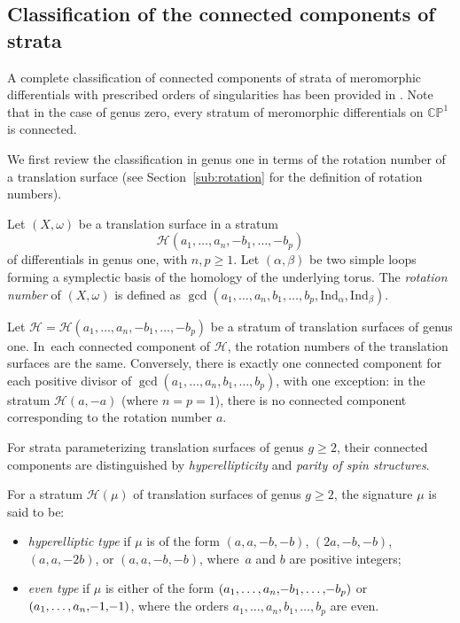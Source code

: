 \subsection{Classification of the connected components of strata}\label{sub:CCClassification}

A complete classification of connected components of strata of meromorphic differentials with prescribed orders of singularities has been provided in \cite{Bo}. Note that in the case of genus zero, every stratum of meromorphic differentials on $\mathbb C\mathbb P^1$ is connected.

We first review the classification in genus one in terms of the rotation number of a translation surface (see Section~\ref{sub:rotation} for the definition of rotation numbers).

\begin{defn}
Let $(X,\omega)$ be a translation surface in a stratum
\[
\mathcal{H}(a_{1},\dots,a_{n},-b_{1},\dots,-b_{p})
\]
of differentials in genus one, with $n,p \geq 1$. Let $(\alpha,\beta)$ be two simple loops forming a symplectic basis of the homology of the underlying torus. The \textit{rotation number} of $(X,\omega)$ is defined as $\gcd(a_{1},\dots,a_{n},b_{1},\dots,b_{p},\mathrm{Ind}_{\alpha},\mathrm{Ind}_{\beta})$.
\end{defn}

\begin{thm}\label{thm:BoissyGenusOne}
Let $\mathcal{H}=\mathcal{H}(a_{1},\dots,a_{n},-b_{1},\dots,-b_{p})$ be a stratum of translation surfaces of genus one. In~each connected component of $\mathcal{H}$, the rotation numbers of the translation surfaces are the same. Conversely, there is exactly one connected component for each positive divisor of $\gcd(a_{1},\dots,a_{n},b_{1},\dots,b_{p})$, with one exception: in the stratum $\mathcal{H}(a,-a)$ (where $n=p=1$), there is no connected component corresponding to the rotation number $a$.
\end{thm}

For strata parameterizing translation surfaces of genus $g \geq 2$, their connected components are distinguished by \textit{hyperellipticity} and \textit{parity of spin structures}.

\begin{defn}
For a stratum $\mathcal{H}(\mu)$ of translation surfaces of genus $g \geq 2$, the signature $\mu$ is said to be:
\begin{itemize}
\item \textit{hyperelliptic type} if $\mu$ is of the form $(a,a,-b,-b)$, $(2a,-b,-b)$, $(a,a,-2b)$, or $(a,a,-b,-b)$, where~$a$ and $b$ are positive integers;
\item \textit{even type} if $\mu$ is either of the form $(a_{1},\dots,a_{n},\mkern-3mu -b_{1},\dots,\mkern-3mu -b_{p})$ or $(a_{1},\dots,a_{n},\mkern-3mu-1,\mkern-3mu -1)$, where the orders $a_{1},\dots,a_{n},b_{1},\dots,b_{p}$ are even.
\end{itemize}
\end{defn}

